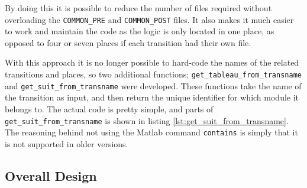 \documentclass[runningheads,a4paper]{llncs}
\newcommand{\GPenSIM}{../GPenSIM}
\begin{document}
By doing this it is possible to reduce the number of files required without overloading the \verb!COMMON_PRE! and \verb!COMMON_POST! files. It also makes it much easier to work and maintain the code as the logic is only located in one place, as opposed to four or seven places if each transition had their own file.
\newline

With this approach it is no longer possible to hard-code the names of the related transitions and places, so two additional functions; \verb!get_tableau_from_transname! and \verb!get_suit_from_transname! were developed. These functions take the name of the transition as input, and then return the unique identifier for which module it belongs to. The actual code is pretty simple, and parts of \verb!get_suit_from_transname! is shown in listing \ref{lst:get_suit_from_transname}. The reasoning behind not using the Matlab command \verb!contains! is simply that it is not supported in older versions.

\clearpage
\subsection{Overall Design}
\end{document}
